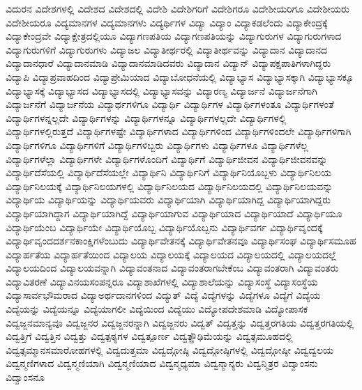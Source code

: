 {ವಿದುರನ
ವಿದೇಶಗಳಲ್ಲಿ
ವಿದೇಶದ
ವಿದೇಶದಲ್ಲಿ
ವಿದೇಶಿ
ವಿದೇಶಿಗರಿಗೆ
ವಿದೇಶಿಗರೂ
ವಿದೇಶೀಯರಿಗೂ
ವಿದೇಶೀಯರು
ವಿದೇಶೀಯರೂ
ವಿದ್ಯಮಾನಗಳ
ವಿದ್ಯಮಾನಗಳು
ವಿದ್ಯರ್ಥಿಗಳ
ವಿದ್ಯಾ
ವಿದ್ಯಾಂ
ವಿದ್ಯಾಕಡಲೆಂದು
ವಿದ್ಯಾಕೇಂದ್ರಕ್ಕೆ
ವಿದ್ಯಾಕೇಂದ್ರವೇ
ವಿದ್ಯಾಕ್ಷೇತ್ರದಲ್ಲಿಯೂ
ವಿದ್ಯಾಗಣಪತಿಯ
ವಿದ್ಯಾಗಣಪತಿಯನ್ನು
ವಿದ್ಯಾಗುರುಗಳ
ವಿದ್ಯಾಗುರುಗಳಾದ
ವಿದ್ಯಾಗುರುಗಳಿಗೆ
ವಿದ್ಯಾಗುರುಗಳು
ವಿದ್ಯಾಜಲ
ವಿದ್ಯಾತೀರ್ಥರಲ್ಲಿ
ವಿದ್ಯಾತೀರ್ಥವನ್ನು
ವಿದ್ಯಾದಾನ
ವಿದ್ಯಾದಾನದ
ವಿದ್ಯಾದಾನಧಾರೆ
ವಿದ್ಯಾದಾನಮಾಡಿ
ವಿದ್ಯಾದಾನಮಾಡಿದವರು
ವಿದ್ಯಾದಾನ
ವಿದ್ಯಾನ್
ವಿದ್ಯಾಪಕ್ಷಪಾತಿಗಳಾಗಿದ್ದರು
ವಿದ್ಯಾಪಿ
ವಿದ್ಯಾಪ್ರವಾಹದಿಂದ
ವಿದ್ಯಾಪ್ರೇಮಿಯಾದ
ವಿದ್ಯಾಬೋಧನೆಯಲ್ಲಿ
ವಿದ್ಯಾಭ್ಯಾಸ
ವಿದ್ಯಾಭ್ಯಾಸಕ್ಕಾಗಿ
ವಿದ್ಯಾಭ್ಯಾಸಕ್ಕೂ
ವಿದ್ಯಾಭ್ಯಾಸಕ್ಕೆ
ವಿದ್ಯಾಭ್ಯಾಸದ
ವಿದ್ಯಾಭ್ಯಾಸದಲ್ಲಿ
ವಿದ್ಯಾಭ್ಯಾಸವನ್ನು
ವಿದ್ಯಾರಣ್ಯ
ವಿದ್ಯಾರ್ಜನೆ
ವಿದ್ಯಾರ್ಜನೆಗಾಗಿ
ವಿದ್ಯಾರ್ಜನೆಗೆ
ವಿದ್ಯಾರ್ಜನೆಯ
ವಿದ್ಯಾರ್ಥಗಳಿಗೂ
ವಿದ್ಯಾರ್ಥಿ
ವಿದ್ಯಾರ್ಥಿಗಳ
ವಿದ್ಯಾರ್ಥಿಗಳಂತೂ
ವಿದ್ಯಾರ್ಥಿಗಳಂತೆ
ವಿದ್ಯಾರ್ಥಿಗಳನ್ನಲ್ಲದೇ
ವಿದ್ಯಾರ್ಥಿಗಳನ್ನು
ವಿದ್ಯಾರ್ಥಿಗಳನ್ನೂ
ವಿದ್ಯಾರ್ಥಿಗಳಲ್ಲದೇ
ವಿದ್ಯಾರ್ಥಿಗಳಲ್ಲಿ
ವಿದ್ಯಾರ್ಥಿಗಳಲ್ಲಿರುತ್ತದೆ
ವಿದ್ಯಾರ್ಥಿಗಳಷ್ಟೇ
ವಿದ್ಯಾರ್ಥಿಗಳಾದ
ವಿದ್ಯಾರ್ಥಿಗಳಿಂದ
ವಿದ್ಯಾರ್ಥಿಗಳಿಂದಲೇ
ವಿದ್ಯಾರ್ಥಿಗಳಿಗಾಗಿ
ವಿದ್ಯಾರ್ಥಿಗಳಿಗೂ
ವಿದ್ಯಾರ್ಥಿಗಳಿಗೆ
ವಿದ್ಯಾರ್ಥಿಗಳಿಬ್ಬರು
ವಿದ್ಯಾರ್ಥಿಗಳು
ವಿದ್ಯಾರ್ಥಿಗಳೂ
ವಿದ್ಯಾರ್ಥಿಗಳೆಲ್ಲ
ವಿದ್ಯಾರ್ಥಿಗಳೆಲ್ಲಾ
ವಿದ್ಯಾರ್ಥಿಗಳೇ
ವಿದ್ಯಾರ್ಥಿಗಳೊಂದಿಗೆ
ವಿದ್ಯಾರ್ಥಿಗೆ
ವಿದ್ಯಾರ್ಥಿಜೀವನ
ವಿದ್ಯಾರ್ಥಿಜೀವನವನ್ನು
ವಿದ್ಯಾರ್ಥಿದೆಸೆಯಲ್ಲಿ
ವಿದ್ಯಾರ್ಥಿದೆಸೆಯಲ್ಲೇ
ವಿದ್ಯಾರ್ಥಿನಿ
ವಿದ್ಯಾರ್ಥಿನಿಗೆ
ವಿದ್ಯಾರ್ಥಿನಿಯೊಬ್ಬಳು
ವಿದ್ಯಾರ್ಥಿನಿಲಯ
ವಿದ್ಯಾರ್ಥಿನಿಲಯಕ್ಕೆ
ವಿದ್ಯಾರ್ಥಿನಿಲಯಗಳಲ್ಲಿ
ವಿದ್ಯಾರ್ಥಿನಿಲಯದ
ವಿದ್ಯಾರ್ಥಿನಿಲಯದಲ್ಲಿ
ವಿದ್ಯಾರ್ಥಿನಿಲಯವನ್ನು
ವಿದ್ಯಾರ್ಥಿಯ
ವಿದ್ಯಾರ್ಥಿಯನ್ನು
ವಿದ್ಯಾರ್ಥಿಯವರು
ವಿದ್ಯಾರ್ಥಿಯಾಗಿ
ವಿದ್ಯಾರ್ಥಿಯಾಗಿದ್ದ
ವಿದ್ಯಾರ್ಥಿಯಾಗಿದ್ದರು
ವಿದ್ಯಾರ್ಥಿಯಾಗಿದ್ದಾಗ
ವಿದ್ಯಾರ್ಥಿಯಾಗಿದ್ದೆ
ವಿದ್ಯಾರ್ಥಿಯಾಗುವ
ವಿದ್ಯಾರ್ಥಿಯಾದ
ವಿದ್ಯಾರ್ಥಿಯಾದೆ
ವಿದ್ಯಾರ್ಥಿಯೂ
ವಿದ್ಯಾರ್ಥಿಯೆಂಬ
ವಿದ್ಯಾರ್ಥಿಯೇ
ವಿದ್ಯಾರ್ಥಿಯೊಬ್ಬ
ವಿದ್ಯಾರ್ಥಿಯೊಬ್ಬನು
ವಿದ್ಯಾರ್ಥಿವರ್ಗ
ವಿದ್ಯಾರ್ಥಿವೃಂದಕ್ಕೆ
ವಿದ್ಯಾರ್ಥಿವೃಂದದರ್ಶನಕಾಂಕ್ಷಿಗಳೆಂಬುದು
ವಿದ್ಯಾರ್ಥಿವೇತನಕ್ಕೆ
ವಿದ್ಯಾರ್ಥಿವೇತನವೂ
ವಿದ್ಯಾರ್ಥಿಸಂಘ
ವಿದ್ಯಾರ್ಥಿಸಮೂಹ
ವಿದ್ಯಾರ್ಹತೆಯ
ವಿದ್ಯಾರ್ಹತೆಯಿಂದ
ವಿದ್ಯಾಲಯ
ವಿದ್ಯಾಲಯಕ್ಕೆ
ವಿದ್ಯಾಲಯದ
ವಿದ್ಯಾಲಯದಲ್ಲಿ
ವಿದ್ಯಾಲಯದಲ್ಲೆ
ವಿದ್ಯಾಲಯದಿಂದ
ವಿದ್ಯಾಲಯವನ್ನಾಗಿ
ವಿದ್ಯಾವಂತನಾದ
ವಿದ್ಯಾವಂತರಾಗಬೇಕೆಂಬ
ವಿದ್ಯಾವಂತರಾಗಿ
ವಿದ್ಯಾವಂತರು
ವಿದ್ಯಾವಿತರಣೆ
ವಿದ್ಯಾವಿನಯಸಂಪನ್ನರೂ
ವಿದ್ಯಾಶಾಖೆಗಳಲ್ಲಿ
ವಿದ್ಯಾಶಾಲೆಯನ್ನು
ವಿದ್ಯಾಸಂಸ್ಥೆ
ವಿದ್ಯಾಸಂಸ್ಥೆಯ
ವಿದ್ಯಾಸಾರ್ವಭೌಮರಾದ
ವಿದ್ಯಾಅರ್ಥದಾನಗಳಿಂದ
ವಿದ್ಯುತ್
ವಿದ್ಯೆ
ವಿದ್ಯೆಗಳನ್ನು
ವಿದ್ಯೆಗಳೂ
ವಿದ್ಯೆಗೆ
ವಿದ್ಯೆಯ
ವಿದ್ಯೆಯನ್ನು
ವಿದ್ಯೆಯನ್ನೂ
ವಿದ್ಯೆಯಾಗಲೀ
ವಿದ್ಯೆಯಿಂದ
ವಿದ್ಯೆಯು
ವಿದ್ಯೋಪದೇಶಮಾಡಿ
ವಿದ್ಯೋಪಾಸಕ
ವಿದ್ವಜ್ಜನಮಾನ್ಯವೂ
ವಿದ್ವಜ್ಜನರ
ವಿದ್ವಜ್ಜನರನ್ನಾಗಿ
ವಿದ್ವಜ್ಜನರು
ವಿದ್ವತ್
ವಿದ್ವತ್ತನ್ನು
ವಿದ್ವತ್ತರಗತಿಯ
ವಿದ್ವತ್ತರಗತಿಯಲ್ಲಿ
ವಿದ್ವತ್ತಿಗೆ
ವಿದ್ವತ್ತಿನ
ವಿದ್ವತ್ತು
ವಿದ್ವತ್ಪಠ್ಯಗಳ
ವಿದ್ವತ್ಪೂರ್ಣ
ವಿದ್ವತ್ಪ್ರೌಢಿಮೆಯನ್ನು
ವಿದ್ವತ್ಸಮೂಹದಲ್ಲಿ
ವಿದ್ವತ್ಸಮ್ಮಾನಸಮಾರೋಹಗಳಲ್ಲಿ
ವಿದ್ವದುತ್ತಮಾ
ವಿದ್ವದ್ಗೋಷ್ಠಿ
ವಿದ್ವದ್ಗೋಷ್ಠಿಗಳಲ್ಲಿ
ವಿದ್ವದ್ಗೋಷ್ಠೀ
ವಿದ್ವದ್ವಲಯ
ವಿದ್ವನ್ಮಣಿಗಳಾದ
ವಿದ್ವನ್ಮಣಿಯಾಗಿ
ವಿದ್ವನ್ಮಣಿಯಾದ
ವಿದ್ವನ್ಮಧ್ಯಮಾ
ವಿದ್ವನ್ಮಾನ್ಯರು
ವಿದ್ವನ್ಮಿತ್ರರ
ವಿದ್ವಾಂಸನು
ವಿದ್ವಾಂಸನೂ
}
